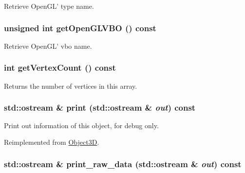 Retrieve OpenGL' type name. \hypertarget{classm3g_1_1VertexArray_720ecee697dbf11d5f90dc998817b39d}{
\subsubsection[{getOpenGLVBO}]{\setlength{\rightskip}{0pt plus 5cm}unsigned int getOpenGLVBO () const}}
\label{classm3g_1_1VertexArray_720ecee697dbf11d5f90dc998817b39d}


Retrieve OpenGL' vbo name. \hypertarget{classm3g_1_1VertexArray_c1c9b7f5b0dcd9c0310d7e77e10081ba}{
\subsubsection[{getVertexCount}]{\setlength{\rightskip}{0pt plus 5cm}int getVertexCount () const}}
\label{classm3g_1_1VertexArray_c1c9b7f5b0dcd9c0310d7e77e10081ba}


Returns the number of vertices in this array. \hypertarget{classm3g_1_1VertexArray_6fea17fa1532df3794f8cb39cb4f911f}{
\subsubsection[{print}]{\setlength{\rightskip}{0pt plus 5cm}std::ostream \& print (std::ostream \& {\em out}) const}}
\label{classm3g_1_1VertexArray_6fea17fa1532df3794f8cb39cb4f911f}


Print out information of this object, for debug only. 

Reimplemented from \hyperlink{classm3g_1_1Object3D_6fea17fa1532df3794f8cb39cb4f911f}{Object3D}.\hypertarget{classm3g_1_1VertexArray_85d61f1cdd10b3b5126cdb20291ae276}{
\subsubsection[{print\_\-raw\_\-data}]{\setlength{\rightskip}{0pt plus 5cm}std::ostream \& print\_\-raw\_\-data (std::ostream \& {\em out}) const}}
\label{classm3g_1_1VertexArray_85d61f1cdd10b3b5126cdb20291ae276}


